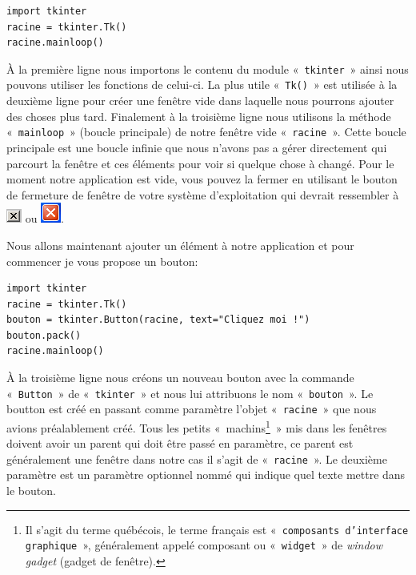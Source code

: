 \begin{Verbatim}[frame=single,rulecolor=\color{mbleu}, label=à taper et sauver dans un nouveau fichier .py]
import tkinter
racine = tkinter.Tk()
racine.mainloop()
\end{Verbatim}

À la première ligne nous importons le contenu du module «~\texttt{tkinter}~» ainsi nous pouvons utiliser les fonctions de celui-ci. La plus utile «~\texttt{Tk()}~»  est utilisée à la deuxième ligne pour créer une fenêtre vide dans laquelle nous pourrons ajouter des choses plus tard. Finalement à la troisième ligne nous utilisons la méthode «~\texttt{mainloop}~» (boucle principale) de notre fenêtre vide «~\texttt{racine}~». Cette boucle principale est une boucle infinie que nous n'avons pas a gérer directement qui parcourt la fenêtre et ces éléments pour voir si quelque chose à changé. Pour le moment notre application est vide, vous pouvez la fermer en utilisant le bouton de fermeture de fenêtre de votre système d'exploitation qui devrait ressembler à  \includegraphics[scale=1]{images/fermer} ou \includegraphics[scale=1]{images/fermer2}.

Nous allons maintenant ajouter un élément à notre application et pour commencer je vous propose un bouton:
\begin{Verbatim}[frame=single,rulecolor=\color{mbleu}, label=à taper et sauver dans un nouveau fichier .py]
import tkinter
racine = tkinter.Tk()
bouton = tkinter.Button(racine, text="Cliquez moi !")
bouton.pack()
racine.mainloop()
\end{Verbatim}

À la troisième ligne nous créons un nouveau bouton avec la commande «~\texttt{Button}~» de «~\texttt{tkinter}~» et nous lui attribuons le nom «~\texttt{bouton}~». Le boutton est créé en passant comme paramètre l'objet «~\texttt{racine}~»  que nous avions préalablement créé. Tous les petits «~machins\footnote{Il s'agit du terme québécois, le terme français est «~\texttt{composants d'interface graphique}~», généralement appelé composant ou  «~\texttt{widget}~»  de \emph{window gadget} (gadget de fenêtre).}~» mis dans les fenêtres doivent avoir un parent qui doit être passé en paramètre, ce parent est généralement une fenêtre dans notre cas il s'agit de «~\texttt{racine}~». Le deuxième paramètre est un paramètre optionnel nommé qui indique quel texte mettre dans le bouton.

